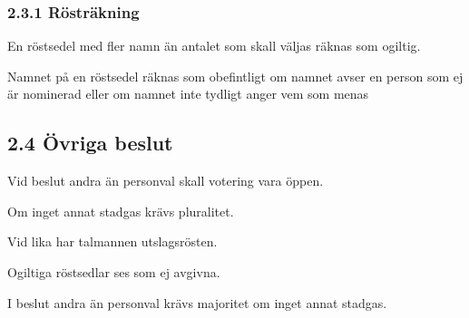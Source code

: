 \documentclass{dsekkallelse}
\begin{document}
\subsubsection{2.3.1 Rösträkning}
En röstsedel med fler namn än antalet som skall väljas räknas som ogiltig.


Namnet på en röstsedel räknas som obefintligt om namnet avser en person som ej är nominerad
eller om namnet inte tydligt anger vem som menas

\subsection{2.4 Övriga beslut}
Vid beslut andra än personval skall votering vara öppen.

Om inget annat stadgas krävs pluralitet.

Vid lika har talmannen utslagsrösten.

Ogiltiga röstsedlar ses som ej avgivna.

I beslut andra än personval krävs majoritet om inget annat stadgas.
\end{document}
